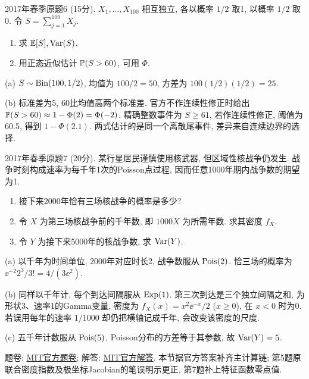 \begin{exercise}\label{m2:2017s:q6}
2017年春季原题6 (15分). $X_1,\ldots,X_{100}$ 相互独立, 各以概率 $1/2$ 取1, 以概率 $1/2$ 取0. 令 $S=\sum_{j=1}^{100}X_j$.
\begin{enumerate}
\item[(a)]\label{m2:2017s:q6:a} 求 $\mathbb E[S],\operatorname{Var}(S)$.
\item[(b)]\label{m2:2017s:q6:b} 用正态近似估计 $\mathbb P(S>60)$, 可用 $\Phi$.
\end{enumerate}
\end{exercise}
\begin{solution}
(a) $S\sim\operatorname{Bin}(100,1/2)$, 均值为 $100/2=50$, 方差为 $100(1/2)(1/2)=25$.

(b) 标准差为5, 60比均值高两个标准差. 官方不作连续性修正时给出 $\mathbb P(S>60)\approx1-\Phi(2)=\Phi(-2)$. 精确整数事件为 $S\ge61$, 若作连续性修正, 阈值为60.5, 得到 $1-\Phi(2.1)$. 两式估计的是同一个离散尾事件, 差异来自连续边界的选择.
\end{solution}

\begin{exercise}\label{m2:2017s:q7}
2017年春季原题7 (20分). 某行星居民谨慎使用核武器, 但区域性核战争仍发生. 战争时刻构成速率为每千年1次的Poisson点过程, 因而任意1000年期内战争数的期望为1.
\begin{enumerate}
\item[(a)]\label{m2:2017s:q7:a} 接下来2000年恰有三场核战争的概率是多少?
\item[(b)]\label{m2:2017s:q7:b} 令 $X$ 为第三场核战争前的千年数, 即 $1000X$ 为所需年数. 求其密度 $f_X$.
\item[(c)]\label{m2:2017s:q7:c} 令 $Y$ 为接下来5000年的核战争数, 求 $\operatorname{Var}(Y)$.
\end{enumerate}
\end{exercise}
\begin{solution}
(a) 以千年为时间单位, 2000年对应时长2, 战争数服从 $\operatorname{Pois}(2)$. 恰三场的概率为 $\ee^{-2}2^3/3!=4/(3\ee^2)$.

(b) 同样以千年计, 每个到达间隔服从 $\operatorname{Exp}(1)$. 第三次到达是三个独立间隔之和, 为形状3、速率1的Gamma变量, 密度为 $f_X(x)=x^2\ee^{-x}/2$ ($x\ge0$), 在 $x<0$ 时为0. 若误用每年的速率 $1/1000$ 却仍把横轴记成千年, 会改变该密度的尺度.

(c) 五千年计数服从 $\operatorname{Pois}(5)$, Poisson分布的方差等于其参数, 故 $\operatorname{Var}(Y)=5$.
\end{solution}

题卷: \href{https://ocw.mit.edu/courses/18-600-probability-and-random-variables-fall-2019/resources/mit18_600f19_mid2_2018/}{MIT官方题卷}; 解答: \href{https://ocw.mit.edu/courses/18-600-probability-and-random-variables-fall-2019/resources/mit18_600f19_mid2_2018_soln/}{MIT官方解答}. 本节据官方答案补齐主计算链; 第5题原联合密度指数及极坐标Jacobian的笔误明示更正, 第7题补上特征函数零点值.

